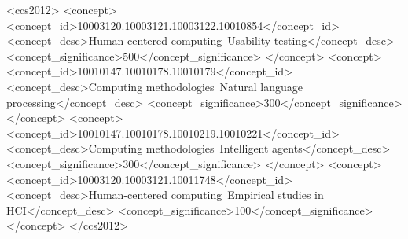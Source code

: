 \documentclass[sigconf,authordraft]{acmart}
\begin{document}
\begin{CCSXML}
<ccs2012>
   <concept>
       <concept_id>10003120.10003121.10003122.10010854</concept_id>
       <concept_desc>Human-centered computing~Usability testing</concept_desc>
       <concept_significance>500</concept_significance>
       </concept>
   <concept>
       <concept_id>10010147.10010178.10010179</concept_id>
       <concept_desc>Computing methodologies~Natural language processing</concept_desc>
       <concept_significance>300</concept_significance>
       </concept>
   <concept>
       <concept_id>10010147.10010178.10010219.10010221</concept_id>
       <concept_desc>Computing methodologies~Intelligent agents</concept_desc>
       <concept_significance>300</concept_significance>
       </concept>
   <concept>
       <concept_id>10003120.10003121.10011748</concept_id>
       <concept_desc>Human-centered computing~Empirical studies in HCI</concept_desc>
       <concept_significance>100</concept_significance>
       </concept>
 </ccs2012>
\end{CCSXML}


\end{document}

